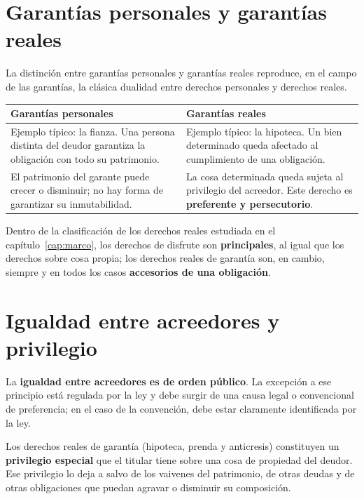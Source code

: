 \documentclass[12pt,oneside]{book}
\begin{document}
\section{Garantías personales y garantías reales}

La distinción entre garantías personales y garantías reales reproduce, en el campo de las garantías, la clásica dualidad entre derechos personales y derechos reales.

\begin{table}[H]
\centering
\begin{tabularx}{\textwidth}{@{}LL@{}}
\toprule
\textbf{Garantías personales} & \textbf{Garantías reales} \\
\midrule
Ejemplo típico: la fianza. Una persona distinta del deudor garantiza la obligación con todo su patrimonio. & Ejemplo típico: la hipoteca. Un bien determinado queda afectado al cumplimiento de una obligación. \\
\addlinespace
El patrimonio del garante puede crecer o disminuir; no hay forma de garantizar su inmutabilidad. & La cosa determinada queda sujeta al privilegio del acreedor. Este derecho es \textbf{preferente y persecutorio}. \\
\bottomrule
\end{tabularx}
\end{table}

Dentro de la clasificación de los derechos reales estudiada en el capítulo~\ref{cap:marco}, los derechos de disfrute son \textbf{principales}, al igual que los derechos sobre cosa propia; los derechos reales de garantía son, en cambio, siempre y en todos los casos \textbf{accesorios de una obligación}.

\section{Igualdad entre acreedores y privilegio}

La \textbf{igualdad entre acreedores es de orden público}. La excepción a ese principio está regulada por la ley y debe surgir de una causa legal o convencional de preferencia; en el caso de la convención, debe estar claramente identificada por la ley.

Los derechos reales de garantía (hipoteca, prenda y anticresis) constituyen un \textbf{privilegio especial} que el titular tiene sobre una cosa de propiedad del deudor. Ese privilegio lo deja a salvo de los vaivenes del patrimonio, de otras deudas y de otras obligaciones que puedan agravar o disminuir su composición.
\end{document}
